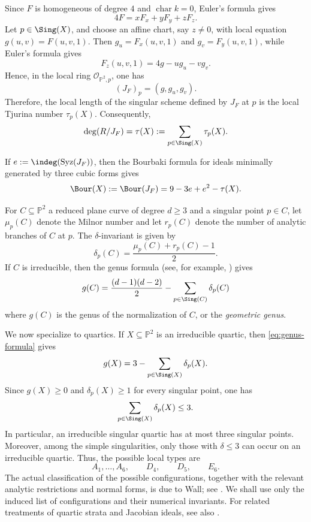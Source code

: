 \documentclass[11pt]{amsart} %
\theoremstyle{definition}
\def\syz{\mbox{\rm Syz}}
\def\NZQ{\mathbb}               %
\def\PP{{\NZQ P}}
\begin{document}
Since $F$ is homogeneous of degree $4$ and $\operatorname{char}k=0$, Euler's formula gives
\[
4F=xF_x+yF_y+zF_z.
\]
Let $p\in \Sing(X)$, and choose an affine chart, say $z\neq 0$, with local equation
$g(u,v)=F(u,v,1)$. Then $g_u=F_x(u,v,1)$ and $g_v=F_y(u,v,1)$, while Euler's formula gives
\[
F_z(u,v,1)=4g-u g_u-v g_v.
\]
Hence, in the local ring $\mathcal O_{\PP^2,p}$, one has
\[
(J_F)_p=(g,g_u,g_v).
\]
Therefore, the local length of the singular scheme defined by $J_F$ at $p$ is the local Tjurina number $\tau_p(X)$. Consequently,
\[
\deg(R/J_F)=\tau(X):=\sum_{p\in\Sing(X)}\tau_p(X).
\]

If $e:=\indeg(\syz(J_F))$, then the Bourbaki formula for ideals minimally generated by three cubic forms gives
\begin{equation}\label{eq:quartic-bour-formula}
\Bour(X):=\Bour(J_F)=9-3e+e^2-\tau(X).
\end{equation}

For $C\subseteq \PP^2$ a reduced plane curve of degree $d\geq 3$ and a singular point $p\in C$, let $\mu_p(C)$ denote the Milnor number and let $r_p(C)$ denote the number of analytic branches of $C$ at $p$. The $\delta$-invariant is given by
\[
\delta_p(C)=\frac{\mu_p(C)+r_p(C)-1}{2}.
\]
If $C$ is irreducible, then the genus formula (see, for example, \cite[Remark 2.1.11]{namba1984geometry}) gives
\begin{equation}\label{eq:genus-formula}
g(C)=\frac{(d-1)(d-2)}{2}-\sum_{p\in\Sing(C)}\delta_p(C)
\end{equation}
where $g(C)$ is the genus of the normalization of $C$, or the \emph{geometric genus}.

We now specialize to quartics. If $X\subseteq \PP^2$ is an irreducible quartic, then \eqref{eq:genus-formula} gives
\[
g(X)=3-\sum_{p\in\Sing(X)}\delta_p(X).
\]
Since $g(X)\geq 0$ and $\delta_p(X)\geq 1$ for every singular point, one has
\[
\sum_{p\in\Sing(X)}\delta_p(X)\leq 3.
\]
In particular, an irreducible singular quartic has at most three singular points. Moreover, among the simple singularities, only those with $\delta\leq 3$ can occur on an irreducible quartic. Thus, the possible local types are
\[
A_1,\ldots,A_6,\qquad D_4,\qquad D_5,\qquad E_6.
\]
The actual classification of the possible configurations, together with the relevant analytic restrictions and normal forms, is due to Wall; see \cite{Wall-quartics}. We shall use only the induced list of configurations and their numerical invariants. For related treatments of quartic strata and Jacobian ideals, see also \cite{Farrahy-NN,NN-Simis-Aluffi}.
\end{document}
